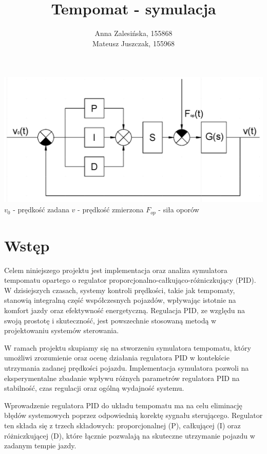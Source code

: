 \documentclass[12pt,a4paper]{article}
\begin{document}
	\title{Tempomat - symulacja}
	\author{Anna Zalesińska, 155868 \\ Mateusz Juszczak, 155968}
	\date{}
	\maketitle
	
	\begin{center}
		\includegraphics[scale=0.45]{"ehh.png"}
  		$v_0$ - prędkość zadana
    		$v$ - prędkość zmierzona
      		$F_{op}$ - siła oporów
	\end{center}
	\section{Wstęp}
	Celem niniejszego projektu jest implementacja oraz analiza symulatora tempomatu opartego o regulator proporcjonalno-całkująco-różniczkujący (PID). W dzisiejszych czasach, systemy kontroli prędkości, takie jak tempomaty, stanowią integralną część współczesnych pojazdów, wpływając istotnie na komfort jazdy oraz efektywność energetyczną. Regulacja PID, ze względu na swoją prostotę i skuteczność, jest powszechnie stosowaną metodą w projektowaniu systemów sterowania.
	
	W ramach projektu skupiamy się na stworzeniu symulatora tempomatu, który umożliwi zrozumienie oraz ocenę działania regulatora PID w kontekście utrzymania zadanej prędkości pojazdu. Implementacja symulatora pozwoli na eksperymentalne zbadanie wpływu różnych parametrów regulatora PID na stabilność, czas regulacji oraz ogólną wydajność systemu.
	
	Wprowadzenie regulatora PID do układu tempomatu ma na celu eliminację błędów systemowych poprzez odpowiednią korektę sygnału sterującego. Regulator ten składa się z trzech składowych: proporcjonalnej (P), całkującej (I) oraz różniczkującej (D), które łącznie pozwalają na skuteczne utrzymanie pojazdu w zadanym tempie jazdy.
	
\end{document}
